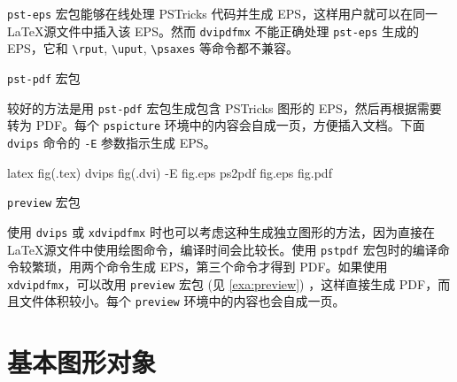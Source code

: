  \texttt{pst-eps} 宏包能够在线处理 PSTricks 代码并生成 EPS，这样用户就可以在同一 \LaTeX 源文件中插入该 EPS。然而 \texttt{dvipdfmx} 不能正确处理 \texttt{pst-eps} 生成的 EPS，它和 \verb|\rput|, \verb|\uput|, \verb|\psaxes| 等命令都不兼容。

\begin{example}[h]
\caption{ \texttt{pst-pdf} 宏包}
\label{exa:pst-pdf}
\end{example}

较好的方法是用 \texttt{pst-pdf} 宏包生成包含 PSTricks 图形的 EPS，然后再根据需要转为 PDF。每个 \texttt{pspicture} 环境中的内容会自成一页，方便插入文档。下面 \texttt{dvips} 命令的 \texttt{-E} 参数指示生成 EPS。

\begin{Code}[]
latex fig(.tex)
dvips fig(.dvi) -E fig.eps
ps2pdf fig.eps fig.pdf
\end{Code}

\begin{example}[htbp]
\caption{ \texttt{preview} 宏包}
\label{exa:preview}
\end{example}

使用 \texttt{dvips} 或 \texttt{xdvipdfmx} 时也可以考虑这种生成独立图形的方法，因为直接在 \LaTeX 源文件中使用绘图命令，编译时间会比较长。使用 \texttt{pst\-pdf} 宏包时的编译命令较繁琐，用两个命令生成 EPS，第三个命令才得到 PDF。如果使用 \texttt{xdvipdfmx}，可以改用 \texttt{preview} 宏包 (见 \autoref{exa:preview}) ，这样直接生成 PDF，而且文件体积较小。每个 \texttt{preview} 环境中的内容也会自成一页。

\section{基本图形对象}
